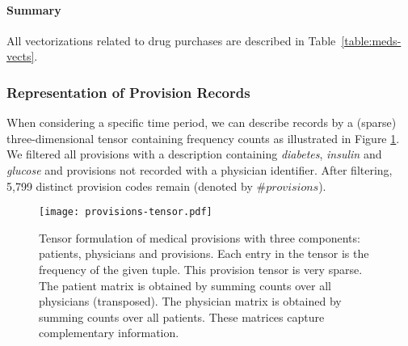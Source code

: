 \paragraph{Summary} All vectorizations related to drug purchases are described in Table~\ref{table:meds-vects}.

\begin{table}[!h]
\centering
{}
\caption{Summary of vectorization schemes used for records of drug purchases.}
\label{table:meds-vects}
\end{table}

\subsubsection{Representation of Provision Records} \label{nomenclature}
When considering a specific time period, we can describe records by a (sparse) three-dimensional tensor containing frequency counts as illustrated in Figure \ref{fig:provisions-tensor}. We filtered all provisions with a description containing \emph{diabetes}, \emph{insulin} and \emph{glucose} and provisions not recorded with a physician identifier. After filtering, 5,799 distinct provision codes remain (denoted by $\# provisions$).

\begin{figure}[!h]
  \centering
  \texttt{[image: provisions-tensor.pdf]}
  \caption{Tensor formulation of medical provisions with three components: patients, physicians and provisions. Each entry in the tensor is the frequency of the given tuple. This provision tensor is very sparse. The patient matrix is obtained by summing counts over all physicians (transposed). The physician matrix is obtained by summing counts over all patients. These matrices capture complementary information.} 
  \label{fig:provisions-tensor}
\end{figure}

